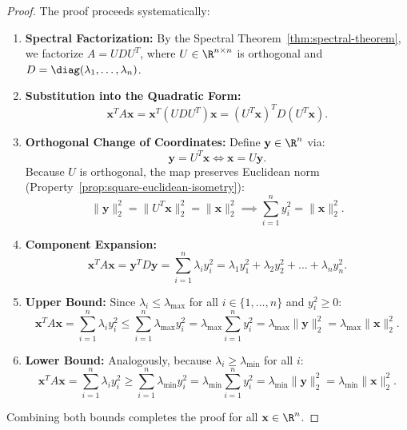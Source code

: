 \begin{proof}
The proof proceeds systematically:
\begin{enumerate}
    \item \textbf{Spectral Factorization:} By the Spectral Theorem~\ref{thm:spectral-theorem}, we factorize $A = U D U^T$, where $U \in \R^{n \times n}$ is orthogonal and $D = \diag(\lambda_1, \dots, \lambda_n)$.
    \item \textbf{Substitution into the Quadratic Form:}
    \begin{equation}
        \mathbf{x}^T A \mathbf{x} = \mathbf{x}^T (U D U^T) \mathbf{x} = (U^T \mathbf{x})^T D (U^T \mathbf{x}).
    \end{equation}
    \item \textbf{Orthogonal Change of Coordinates:} Define $\mathbf{y} \in \R^n$ via:
    \begin{equation}
        \mathbf{y} = U^T \mathbf{x} \iff \mathbf{x} = U \mathbf{y}.
    \end{equation}
    Because $U$ is orthogonal, the map preserves Euclidean norm (Property~\ref{prop:square-euclidean-isometry}):
    \begin{equation}
        \|\mathbf{y}\|_2^2 = \|U^T \mathbf{x}\|_2^2 = \|\mathbf{x}\|_2^2 \implies \sum_{i=1}^n y_i^2 = \|\mathbf{x}\|_2^2.
    \end{equation}
    \item \textbf{Component Expansion:}
    \begin{equation}
        \mathbf{x}^T A \mathbf{x} = \mathbf{y}^T D \mathbf{y} = \sum_{i=1}^n \lambda_i y_i^2 = \lambda_1 y_1^2 + \lambda_2 y_2^2 + \dots + \lambda_n y_n^2.
    \end{equation}
    \item \textbf{Upper Bound:}
    Since $\lambda_i \le \lambda_{\max}$ for all $i \in \{1, \dots, n\}$ and $y_i^2 \ge 0$:
    \begin{equation}
        \mathbf{x}^T A \mathbf{x} = \sum_{i=1}^n \lambda_i y_i^2 \le \sum_{i=1}^n \lambda_{\max} y_i^2 = \lambda_{\max} \sum_{i=1}^n y_i^2 = \lambda_{\max} \|\mathbf{y}\|_2^2 = \lambda_{\max} \|\mathbf{x}\|_2^2.
    \end{equation}
    \item \textbf{Lower Bound:}
    Analogously, because $\lambda_i \ge \lambda_{\min}$ for all $i$:
    \begin{equation}
        \mathbf{x}^T A \mathbf{x} = \sum_{i=1}^n \lambda_i y_i^2 \ge \sum_{i=1}^n \lambda_{\min} y_i^2 = \lambda_{\min} \sum_{i=1}^n y_i^2 = \lambda_{\min} \|\mathbf{y}\|_2^2 = \lambda_{\min} \|\mathbf{x}\|_2^2.
    \end{equation}
\end{enumerate}
Combining both bounds completes the proof for all $\mathbf{x} \in \R^n$.
\end{proof}

